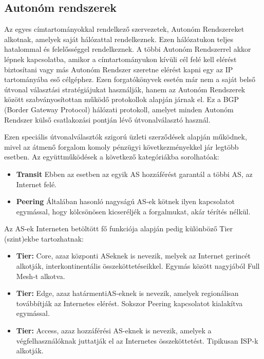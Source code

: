 \subsection{Autonóm rendszerek}

Az egyes címtartományokkal rendelkező szervezetek, Autonóm Rendszereket alkotnak, amelyek saját hálózattal rendelkeznek. Ezen hálózatukon teljes hatalommal és felelősséggel rendelkeznek. A többi Autonóm Rendszerrel akkor lépnek kapcsolatba, amikor a címtartományukon kívüli cél felé kell elérést biztosítani vagy más Autonóm Rendszer szeretne elérést kapni egy az IP tartományába eső célgéphez.
Ezen forgatókönyvek esetén már nem a saját belső útvonal választási stratégiájukat használják, hanem az Autonóm Rendszerek között szabványosítottan működő protokollok alapján járnak el. Ez a BGP (Border Gateway Protocol) hálózati protokoll, amelyet minden Autonóm Rendszer külső csatlakozási pontján lévő útvonalválasztó használ. 

Ezen speciális útvonalválasztók szigorú üzleti szerződések alapján működnek, mivel az átmenő forgalom komoly pénzügyi következményekkel jár legtöbb esetben. Az együttműködések a következő kategóriákba sorolhatóak:

\begin{itemize}
\setlength{\parskip}{0pt}
\setlength{\itemsep}{0pt plus 1pt}
  
\item \textbf{Transit} Ebben az esetben az egyik AS hozzáférést garantál a többi AS, az Internet felé.
\item \textbf{Peering} Általában hasonló nagyságú AS-ek kötnek ilyen kapcsolatot egymással, hogy kölcsönösen kicseréljék a forgalmukat, akár térítés nélkül.
\end{itemize}

Az AS-ek Interneten betöltött fő funkciója alapján pedig különböző Tier (szint)\-ekbe tartozhatnak: 

\begin{itemize}
\setlength{\parskip}{0pt}
\setlength{\itemsep}{0pt plus 1pt}
  
\item \textbf{Tier:} Core, azaz központi AS\-eknek is nevezik, melyek az Internet gerincét alkotják, interkontinentális összeköttetéseikkel. Egymás között nagyjából Full Mesh-t alkotva.

\item \textbf{Tier:} Edge, azaz \glqq határmenti\grqq AS-eknek is nevezik, amelyek regionálisan továbbítják az Internetes elérést. Sokszor Peering kapcsolatot kialakítva egymással.

\item \textbf{Tier:} Access, azaz hozzáférési AS-eknek is nevezik, amelyek a végfelhasználóknak juttatják el az Internetes összeköttetést. Tipikusan ISP-k alkotják.
\end{itemize}










